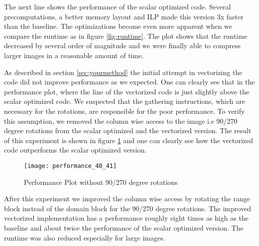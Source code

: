 The next line shows the performance of the scalar optimized code. Several precomputations, a better
memory layout and ILP made this version 3x faster than the baseline. The optimizations become even 
more apparent when we compare the runtime as in figure \ref{fig:runtime}. The plot shows that the runtime
decreased by several order of magnitude and we were finally able to compress larger images in a reasonable 
amount of time.


As described in section \ref{sec:yourmethod} the initial attempt in vectorizing the code did not improve
performance as we expected. One can clearly see that in the performance plot, where the line of the vectorized
code is just slightly above the scalar optimized code. We suspected that the gathering instructions, which are
necessary for the rotations, are responsible for the poor performance. To verify this assumption, we removed the
column wise access to the image i.e 90/270 degree rotations from the scalar optimized and the vectorized version.
The result of this experiment is shown in figure \ref{fig:perf_40_41} and one can clearly see how the vectorized
code outperforms the scalar optimized version.

\begin{figure}
  \centering
  \texttt{[image: performance\_40\_41]}
  \caption{Performance Plot without 90/270 degree rotations}
  \label{fig:perf_40_41}
\end{figure}

After this experiment we improved the column wise access by rotating the range 
block instead of the domain block for the 90/270 degree rotations. The improved 
vectorized implementation has a performance roughly eight times as high as the 
baseline and about twice the performance of the scalar optimized version. The 
runtime was also reduced especially for large images.

